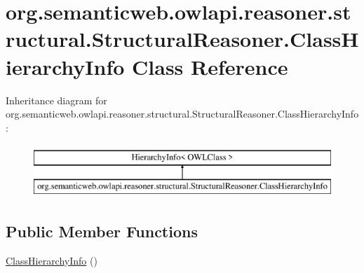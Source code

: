 \hypertarget{classorg_1_1semanticweb_1_1owlapi_1_1reasoner_1_1structural_1_1_structural_reasoner_1_1_class_hierarchy_info}{\section{org.\-semanticweb.\-owlapi.\-reasoner.\-structural.\-Structural\-Reasoner.\-Class\-Hierarchy\-Info Class Reference}
\label{classorg_1_1semanticweb_1_1owlapi_1_1reasoner_1_1structural_1_1_structural_reasoner_1_1_class_hierarchy_info}
}
Inheritance diagram for org.\-semanticweb.\-owlapi.\-reasoner.\-structural.\-Structural\-Reasoner.\-Class\-Hierarchy\-Info\-:\begin{figure}[H]
\begin{center}
\leavevmode
\includegraphics[height=2.000000cm]{classorg_1_1semanticweb_1_1owlapi_1_1reasoner_1_1structural_1_1_structural_reasoner_1_1_class_hierarchy_info}
\end{center}
\end{figure}
\subsection*{Public Member Functions}
\begin{DoxyCompactItemize}
\item 
\hyperlink{classorg_1_1semanticweb_1_1owlapi_1_1reasoner_1_1structural_1_1_structural_reasoner_1_1_class_hierarchy_info_aa2c81230c987c963a708578837a8c7fa}{Class\-Hierarchy\-Info} ()
\end{DoxyCompactItemize}
